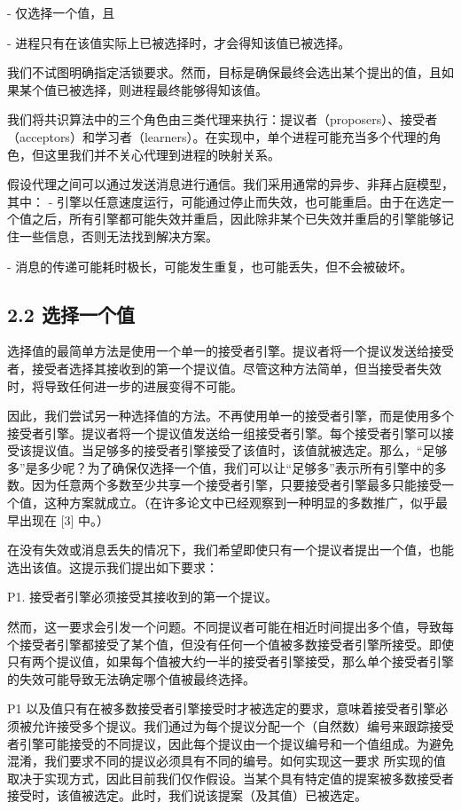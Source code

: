 \documentclass[12pt,a4paper]{report} %
\begin{document}
- 仅选择一个值，且

- 进程只有在该值实际上已被选择时，才会得知该值已被选择。

我们不试图明确指定活锁要求。然而，目标是确保最终会选出某个提出的值，且如果某个值已被选择，则进程最终能够得知该值。

我们将共识算法中的三个角色由三类代理来执行：提议者（proposers）、接受者（acceptors）和学习者（learners）。在实现中，单个进程可能充当多个代理的角色，但这里我们并不关心代理到进程的映射关系。

假设代理之间可以通过发送消息进行通信。我们采用通常的异步、非拜占庭模型，其中：
- 引擎以任意速度运行，可能通过停止而失效，也可能重启。由于在选定一个值之后，所有引擎都可能失效并重启，因此除非某个已失效并重启的引擎能够记住一些信息，否则无法找到解决方案。

- 消息的传递可能耗时极长，可能发生重复，也可能丢失，但不会被破坏。

\subsection*{2.2 选择一个值}

选择值的最简单方法是使用一个单一的接受者引擎。提议者将一个提议发送给接受者，接受者选择其接收到的第一个提议值。尽管这种方法简单，但当接受者失效时，将导致任何进一步的进展变得不可能。

因此，我们尝试另一种选择值的方法。不再使用单一的接受者引擎，而是使用多个接受者引擎。提议者将一个提议值发送给一组接受者引擎。每个接受者引擎可以接受该提议值。当足够多的接受者引擎接受了该值时，该值就被选定。那么，“足够多”是多少呢？为了确保仅选择一个值，我们可以让“足够多”表示所有引擎中的多数。因为任意两个多数至少共享一个接受者引擎，只要接受者引擎最多只能接受一个值，这种方案就成立。（在许多论文中已经观察到一种明显的多数推广，似乎最早出现在 [3] 中。）

在没有失效或消息丢失的情况下，我们希望即使只有一个提议者提出一个值，也能选出该值。这提示我们提出如下要求：

P1. 接受者引擎必须接受其接收到的第一个提议。

然而，这一要求会引发一个问题。不同提议者可能在相近时间提出多个值，导致每个接受者引擎都接受了某个值，但没有任何一个值被多数接受者引擎所接受。即使只有两个提议值，如果每个值被大约一半的接受者引擎接受，那么单个接受者引擎的失效可能导致无法确定哪个值被最终选择。

P1 以及值只有在被多数接受者引擎接受时才被选定的要求，意味着接受者引擎必须被允许接受多个提议。我们通过为每个提议分配一个（自然数）编号来跟踪接受者引擎可能接受的不同提议，因此每个提议由一个提议编号和一个值组成。为避免混淆，我们要求不同的提议必须具有不同的编号。如何实现这一要求
所实现的值取决于实现方式，因此目前我们仅作假设。当某个具有特定值的提案被多数接受者接受时，该值被选定。此时，我们说该提案（及其值）已被选定。
\end{document}
